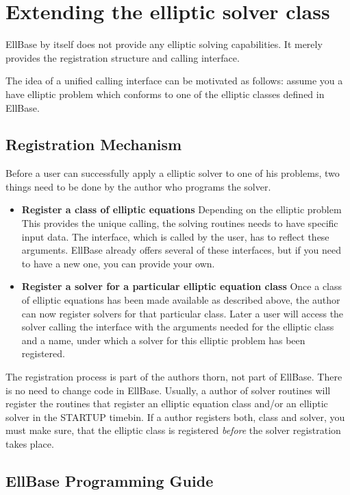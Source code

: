\documentclass{article}
\begin{document}
\section{Extending the elliptic solver class}

EllBase by itself does not provide any elliptic solving capabilities. 
It merely provides the registration structure and calling interface.

The idea of a unified calling interface can be motivated as follows: 
assume you a have elliptic problem which conforms to one of the elliptic 
classes defined in EllBase.


\subsection{Registration Mechanism}

Before a user can successfully apply a elliptic solver to one of his problems,
two things need to be done by the author who programs the solver.
\begin{itemize}
\item{\bf Register a class of elliptic equations} Depending on the elliptic 
problem This provides the unique calling, the solving routines needs to have 
specific input data. The interface, which is called by the user, has to 
reflect these arguments. EllBase already offers 
several of these interfaces, but if you need to have a new one, you can 
provide your own.

\item{\bf Register a solver for a particular elliptic equation class}
Once a class of elliptic equations has been made available as described 
above, the author can now register solvers for that particular class. 
Later a user will access the solver calling the interface with the 
arguments needed for the elliptic class and a name, under which a solver 
for this elliptic problem has been registered.
\end{itemize}

The registration process is part of the authors thorn, not part of EllBase. 
There is no need to change code in EllBase. Usually, a author of solver 
routines will register the routines that register an elliptic equation class 
and/or an elliptic solver in the STARTUP timebin. If a author registers both, class and solver, you must make 
sure, that the elliptic class is registered {\em before} the solver 
registration takes place. 

\subsection{EllBase Programming Guide}
\end{document}

